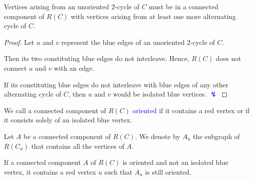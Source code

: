 \documentclass{beamer}
\theoremstyle{definition}
\def\spadding{\vspace{0.25cm}}
\def\b{\textcolor{blue}}
\begin{document}
\begin{frame}

\begin{lemma}
\label{lem:7}
Vertices arising from an unoriented $2$-cycle of $C$ must be in a connected component of $R(C)$ with vertices arising from at least one more alternating cycle of $C$.
\end{lemma}

\begin{center}
\end{center}\pause

\begin{proof}
Let $u$ and $v$ represent the blue edges of an unoriented $2$-cycle of $C$. \par\pause
Then its two constituting blue edges do not interleave. Hence, $R(C)$ does not connect $u$ and $v$ with an edge. \par\pause
If its constituting blue edges do not interleave with blue edges of any other alternating cycle of $C$, then $u$ and $v$ would be isolated blue vertices. \b{$\lightning$}
\end{proof}

\end{frame}

\begin{frame}

\begin{definition}
We call a connected component of $R(C)$ \b{oriented} if it contains a red vertex or if it consists solely of an isolated blue vertex. \pause\spadding

Let $A$ be a connected component of $R(C)$. We denote by $A_u$ the subgraph of $R(C_u)$ that contains all the vertices of $A$.
\end{definition}\pause

\begin{lemma}
\label{lem:4}
If a connected component $A$ of $R(C)$ is oriented and not an isolated blue vertex, it contains a red vertex $u$ such that $A_u$ is still oriented.
\end{lemma}

\end{frame}
\end{document}
